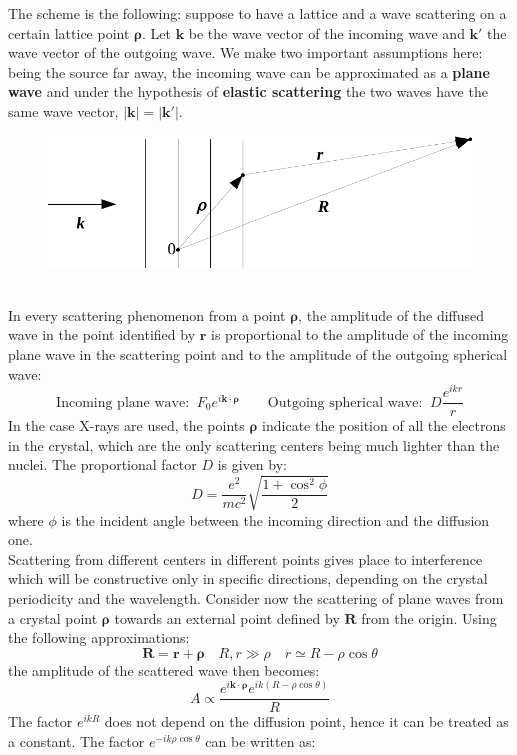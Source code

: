 \documentclass[10.75pt,a4paper,openright,bottom=2cm]{article}
\renewcommand{\Vec}[1]{\boldsymbol{#1}}
\begin{document}
The scheme is the following: suppose to have a lattice and a wave scattering on a certain lattice point $\Vec{\rho}$. Let $\Vec{k}$ be the wave vector of the incoming wave and $\Vec{k'}$ the wave vector of the outgoing wave. We make two important assumptions here: being the source far away, the incoming wave can be approximated as a \textbf{plane wave} and under the hypothesis of \textbf{elastic scattering} the two waves have the same wave vector, $|\Vec{k}|=|\Vec{k'|}$.\\
\begin{figure}[h]
    \centering
    \includegraphics{diffraction.pdf}
    \label{fig:diffraction}
\end{figure}\\
In every scattering phenomenon from a point $\Vec{\rho}$, the amplitude of the diffused wave in the point identified by $\Vec{r}$ is proportional to the amplitude of the incoming plane wave in the scattering point and to the amplitude of the outgoing spherical wave:
\[
\text{Incoming plane wave:}\;\; F_0e^{i\Vec{k}\cdot\Vec{\rho}} \qquad \text{Outgoing spherical wave:}\;\; D\frac{e^{ikr}}{r}
\]
In the case X-rays are used, the points $\Vec{\rho}$ indicate the position of all the electrons in the crystal, which are the only scattering centers being much lighter than the nuclei. The proportional factor $D$ is given by:
\[
D=\frac{e^2}{mc^2}\sqrt{\frac{1+\cos^2\phi}{2}}
\]
where $\phi$ is the incident angle between the incoming direction and the diffusion one.\\
Scattering from different centers in different points gives place to interference which will be constructive only in specific directions, depending on the crystal periodicity and the wavelength. Consider now the scattering of plane waves from a crystal point $\Vec{\rho}$ towards an external point defined by $\Vec{R}$ from the origin. Using the following approximations:
\[
\Vec{R}=\Vec{r}+\Vec{\rho} \quad R,r\gg\rho \quad r\simeq R-\rho\cos\theta
\]
the amplitude of the scattered wave then becomes:
\[
A\propto\frac{e^{i\Vec{k}\cdot\Vec{\rho}}e^{ik(R-\rho\cos\theta)}}{R}
\]
The factor $e^{ikR}$ does not depend on the diffusion point, hence it can be treated as a constant. The factor $e^{-ik\rho\cos\theta}$ can be written as:
\end{document}
